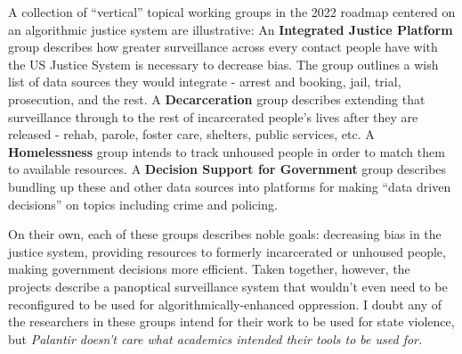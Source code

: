 A collection of ``vertical'' topical working groups in the 2022 roadmap
centered on an algorithmic justice system are illustrative: An
\textbf{Integrated Justice Platform} group describes how greater
surveillance across every contact people have with the US Justice System
is necessary to decrease bias. The group outlines a wish list of data
sources they would integrate - arrest and booking, jail, trial,
prosecution, and the rest. A \textbf{Decarceration} group describes extending that surveillance
through to the rest of incarcerated people's lives after they are
released - rehab, parole, foster care, shelters, public services, etc. A
\textbf{Homelessness} group intends to track unhoused people in order to
match them to available resources. A \textbf{Decision Support for
Government} group
describes bundling up these and other data sources into platforms for
making ``data driven decisions'' on topics including crime and policing.

On their own, each of these groups describes noble goals: decreasing
bias in the justice system, providing resources to formerly incarcerated
or unhoused people, making government decisions more efficient. Taken
together, however, the projects describe a panoptical surveillance
system that wouldn't even need to be reconfigured to be used for
algorithmically-enhanced oppression. I doubt any of the researchers in
these groups intend for their work to be used for state violence, but
\emph{Palantir doesn't care what academics intended their tools to be
used for.}

